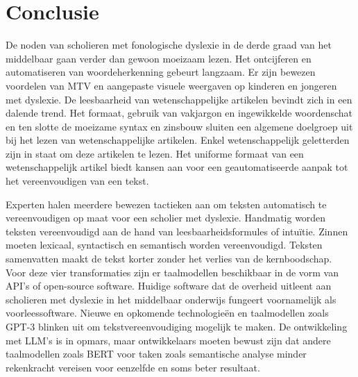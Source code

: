 \section{Conclusie}

De noden van scholieren met fonologische dyslexie in de derde graad van het middelbaar gaan verder dan gewoon moeizaam lezen.  Het ontcijferen en automatiseren van woordeherkenning gebeurt langzaam. Er zijn bewezen voordelen van MTV en aangepaste visuele weergaven op kinderen en jongeren met dyslexie. De leesbaarheid van wetenschappelijke artikelen bevindt zich in een dalende trend. Het formaat, gebruik van vakjargon en ingewikkelde woordenschat en ten slotte de moeizame syntax en zinsbouw sluiten een algemene doelgroep uit bij het lezen van wetenschappelijke artikelen. Enkel wetenschappelijk geletterden zijn in staat om deze artikelen te lezen. Het uniforme formaat van een wetenschappelijk artikel biedt kansen aan voor een geautomatiseerde aanpak tot het vereenvoudigen van een tekst.

\medspace

Experten halen meerdere bewezen tactieken aan om teksten automatisch te vereenvoudigen op maat voor een scholier met dyslexie. Handmatig worden teksten vereenvoudigd aan de hand van leesbaarheidsformules of intuïtie. Zinnen moeten lexicaal, syntactisch en semantisch worden vereenvoudigd. Teksten samenvatten maakt de tekst korter zonder het verlies van de kernboodschap. Voor deze vier transformaties zijn er taalmodellen beschikbaar in de vorm van API's of open-source software. Huidige software dat de overheid uitleent aan scholieren met dyslexie in het middelbaar onderwijs fungeert voornamelijk als voorleessoftware. Nieuwe en opkomende technologieën en taalmodellen zoals GPT-3 blinken uit om tekstvereenvoudiging mogelijk te maken. De ontwikkeling met LLM's is in opmars, maar ontwikkelaars moeten bewust zijn dat andere taalmodellen zoals BERT voor taken zoals semantische analyse minder rekenkracht vereisen voor eenzelfde en soms beter resultaat. 